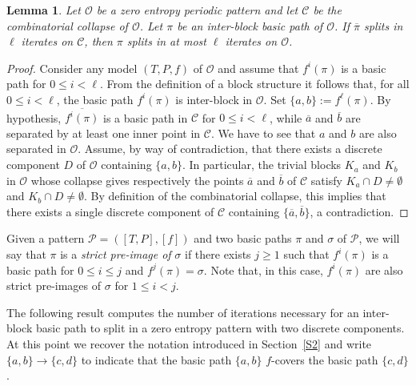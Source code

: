 \documentclass[a4paper]{amsart}
\newtheorem{lemma}[theorem]{Lemma}
\theoremstyle{definition}
\begin{document}
\begin{lemma}\label{herencia}
Let $\mathcal{O}$ be a zero entropy periodic pattern and let $\mathcal{C}$ be the combinatorial collapse of $\mathcal{O}$.
Let $\pi$ be an inter-block basic path of $\mathcal{O}$. If $\overline{\pi}$ splits in $\ell$ iterates on $\mathcal{C}$, then $\pi$
splits in at most $\ell$ iterates on $\mathcal{O}$.
\end{lemma}
\begin{proof}
Consider any model $(T,P,f)$ of $\mathcal{O}$ and assume that $f^i(\pi)$ is a basic path for $0\le i<\ell$. From the definition of a block
structure it follows that, for all $0\le i<\ell$, the basic path $f^i(\pi)$ is inter-block in $\mathcal{O}$. Set $\{a,b\}:=f^\ell(\pi)$. By hypothesis,
$\overline{f^i(\pi)}$ is a basic path in $\mathcal{C}$ for $0\le i<\ell$, while $\overline{a}$ and $\overline{b}$ are separated by at least one inner point in $\mathcal{C}$.
We have to see that $a$ and $b$ are also separated in $\mathcal{O}$. Assume, by way of contradiction, that there exists a discrete component $D$ of
$\mathcal{O}$ containing $\{a,b\}$. In particular, the trivial blocks $K_a$ and $K_b$ in $\mathcal{O}$ whose collapse gives respectively the points
$\overline{a}$ and $\overline{b}$ of $\mathcal{C}$ satisfy $K_a\cap D\ne\emptyset$ and $K_b\cap D\ne\emptyset$. By definition of the combinatorial
collapse, this implies that there exists a single discrete component of $\mathcal{C}$ containing $\{\overline{a},\overline{b}\}$, a contradiction.
\end{proof}

Given a pattern $\mathcal{P}=([T,P],[f])$ and two basic paths $\pi$ and $\sigma$ of $\mathcal{P}$, we will say that $\pi$ is a \emph{strict pre-image of} $\sigma$
if there exists $j\ge1$ such that $f^i(\pi)$ is a basic path for $0\le i\le j$ and $f^j(\pi)=\sigma$. Note that, in this case, $f^i(\pi)$ are also strict
pre-images of $\sigma$ for $1\le i<j$.

The following result computes the number of iterations necessary for an inter-block basic path to split in a zero entropy pattern with two discrete components.
At this point we recover the notation introduced in Section~\ref{S2} and write $\{a,b\}\rightarrow \{c,d\}$ to indicate that the basic path $\{a,b\}$ $f$-covers the basic path $\{c,d\}$.
\end{document}
